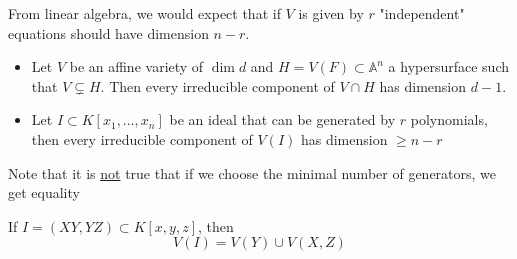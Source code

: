 \documentclass[../main.tex]{subfiles}
\begin{document}
From linear algebra, we would expect that if $V$ is given by $r$ "independent" equations should have dimension $n-r$.
\begin{propo}
	\begin{itemize}
	\item 
	Let $V$ be an affine variety of $\dim d$ and $H = V( F) \subset \mathbb{A}^{n}$ a hypersurface such that $V \subsetneq H$. Then every irreducible component of $V \cap H$ has dimension $d-1$.\\

\item Let $I \subset K[x_1,\ldots,x_n]$ be an ideal that can be generated by $r$ polynomials, then every irreducible component of $V( I) $ has dimension $ \geq n-r$ 

	\end{itemize}
\end{propo}
Note that it is \underline {not} true that if we choose the minimal number of generators, we get equality
\begin{exemple}
	If $ I = ( XY,YZ) \subset K[x,y,z]$, then
	\[ 
	V( I) = V( Y) \cup V( X,Z) 
	\]
	
\end{exemple}






				

					
\end{document}
